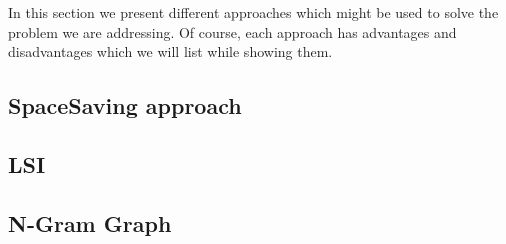 In this section we present different approaches which might be used to solve the problem we are addressing. Of course, each approach has advantages and disadvantages which we will list while showing them.

\subsection*{SpaceSaving approach}


\subsection*{LSI}


\subsection*{N-Gram Graph}

